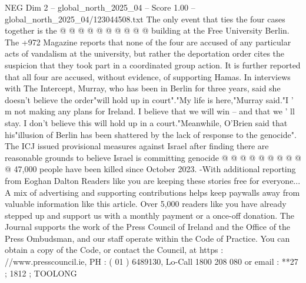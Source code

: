 \begin{textsample}{NEG Dim 2 – global\_north\_2025\_04 – Score 1.00 – global\_north\_2025\_04/123044508.txt}
The only event that ties the four cases together is the @ @ @ @ @ @ @ @ @ @ building at the Free University Berlin.
The +972 Magazine reports that none of the four are accused of any particular acts of vandalism at the university, but rather the deportation order cites the suspicion that they took part in a coordinated group action.
It is further reported that all four are accused, without evidence, of supporting Hamas.
In interviews with The Intercept, Murray, who has been in Berlin for three years, said she doesn't believe the order"will hold up in court"."My life is here,"Murray said."I ' m not making any plans for Ireland.
I believe that we will win -- and that we ' ll stay.
I don't believe this will hold up in a court."Meanwhile, O'Brien said that his"illusion of Berlin has been shattered by the lack of response to the genocide".
The ICJ issued provisional measures against Israel after finding there are reasonable grounds to believe Israel is committing genocide @ @ @ @ @ @ @ @ @ @ 47,000 people have been killed since October 2023. -With additional reporting from Eoghan Dalton Readers like you are keeping these stories free for everyone...
A mix of advertising and supporting contributions helps keep paywalls away from valuable information like this article.
Over 5,000 readers like you have already stepped up and support us with a monthly payment or a once-off donation.
The Journal supports the work of the Press Council of Ireland and the Office of the Press Ombudsman, and our staff operate within the Code of Practice.
You can obtain a copy of the Code, or contact the Council, at https : //www.presscouncil.ie, PH : ( 01 ) 6489130, Lo-Call 1800 208 080 or email : **27 ; 1812 ; TOOLONG

\end{textsample}
